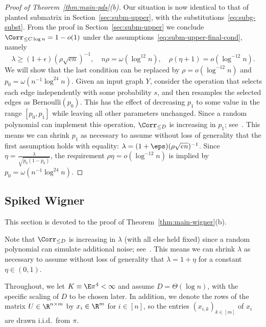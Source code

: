 \documentclass[11pt]{article}
\begin{document}
\begin{proof}[Proof of Theorem~\ref{thm:main-pds}(b)]
Our situation is now identical to that of planted submatrix in Section~\ref{sec:subm-upper}, with the substitutions~\eqref{eq:subg-subst}. From the proof in Section~\ref{sec:subm-upper} we conclude $\Corr_{\le C \log n} = 1-o(1)$ under the assumptions~\eqref{eq:subm-upper-final-cond}, namely
\[ \lambda \ge (1+\epsilon)(\rho\sqrt{en})^{-1}, \quad n \rho = \omega(\log^{12} n), \quad \rho(\eta+1) = o(\log^{-12} n). \]
We will show that the last condition can be replaced by $\rho = o(\log^{-12} n)$ and $p_0 = \omega(n^{-1} \log^{24} n)$. Given an input graph $Y$, consider the operation that selects each edge independently with some probability $s$, and then resamples the selected edges as Bernoulli$(p_0)$. This has the effect of decreasing $p_1$ to some value in the range $[p_0,p_1]$ while leaving all other parameters unchanged. Since a random polynomial can implement this operation, $\Corr_{\le D}$ is increasing in $p_1$; see~\cite[Claim~A.1 \& Fact~1.1]{SW-estimation}. This means we can shrink $p_1$ as necessary to assume without loss of generality that the first assumption holds with equality: $\lambda = (1+\eps)(\rho\sqrt{en})^{-1}$. Since $\eta = \frac{ \lambda}{\sqrt{p_0(1-p_0)}}$, the requirement $\rho\eta = o(\log^{-12} n)$ is implied by $p_0 = \omega(n^{-1} \log^{24} n)$.
\end{proof}




\subsection{Spiked Wigner}

This section is devoted to the proof of Theorem~\ref{thm:main-wigner}(b).

Note that $\Corr_{\le D}$ is increasing in $\lambda$ (with all else held fixed) since a random polynomial can simulate additional noise; see~\cite[Claim~A.2 \& Fact~1.1]{SW-estimation}. This means we can shrink $\lambda$ as necessary to assume without loss of generality that $\lambda = 1+\eta$ for a constant $\eta \in (0,1)$.

Throughout, we let $K\equiv \E\pi^4<\infty$ and assume $D=\Theta(\log n)$, with the specific scaling of $D$ to be chosen later. In addition, we denote the rows of the matrix $U\in \R^{n\times m}$ by $x_i \in \R^m$ for $i \in [n]$, so the entries $(x_{i,k})_{k \in [m]}$ of $x_i$ are drawn i.i.d.\ from $\pi$.
\end{document}
